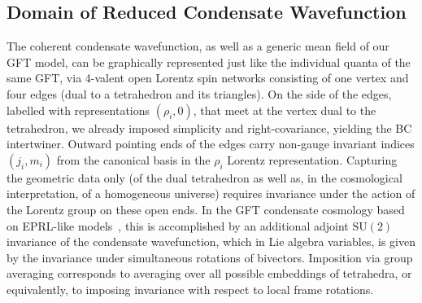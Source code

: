 \documentclass[11pt,a4paper]{article}
\newcommand{\SU}{\text{SU$(2)$}}
\begin{document}
\subsection{Domain of Reduced Condensate Wavefunction}\label{subsec:Domain of Condensate Wavefunction}

The coherent condensate wavefunction, as well as a generic mean field of our GFT model, can be graphically represented just like the individual quanta of the same GFT, via 4-valent open Lorentz spin networks consisting of one vertex and four edges (dual to a tetrahedron and its triangles). On the side of the edges, labelled with representations $(\rho_i,0)$, that meet at the vertex dual to the tetrahedron, we already imposed simplicity and right-covariance, yielding the BC intertwiner. Outward pointing ends of the edges carry non-gauge invariant indices $(j_i,m_i)$ from the canonical basis in the $\rho_i$ Lorentz representation. Capturing the geometric data only (of the dual tetrahedron as well as, in the cosmological interpretation, of a homogeneous universe) requires invariance under the action of the Lorentz group on these open ends. In the GFT condensate cosmology based on EPRL-like models~\cite{Gielen:2014ila,Oriti:2016qtz,deCesare:2017ynn}, this is accomplished by an additional adjoint $\SU$ invariance of the condensate wavefunction, which in Lie algebra variables, is given by the invariance under simultaneous rotations of bivectors. Imposition via group averaging corresponds to averaging over all possible embeddings of tetrahedra, or equivalently, to imposing invariance with respect to local frame rotations. 
\end{document}
